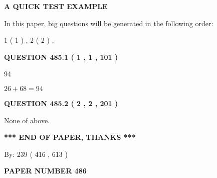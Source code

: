 \documentclass[12pt]{article}
\begin{document}
   
 \vspace{0.2in}
{\LARGE {\textbf{ A QUICK TEST EXAMPLE}}}
   
   
   
\vspace{0.2in}
   
In this paper, big questions will be generated in the following order: 
   
   
   1 ( 1 )
 ,
   2 ( 2 )
 .
  
\vspace{0.2in}
  
{\textbf{\Large{QUESTION
485.1 
 ( 1 , 1 , 101 )
}}}
  
  
 
 
\noindent{}

94
 
 
 
 
\noindent{}

$ %
26 +  %
68=   %
94$
 
 
  
\vspace{0.2in}
  
{\textbf{\Large{QUESTION
485.2 
 ( 2 , 2 , 201 )
}}}
  
  
 
 
\noindent{}
 
 
 None of above.
 
 
 
 
   
   
 \vspace{0.2in}
 
   
   
   
   
\vspace{1.0in} 
{\textbf{\large{ *** END OF PAPER, THANKS *** }}} 
   
   
\hspace{1.0in} By: 
 239 ( 416 ,  613 )
   
   
   
   
\newpage 
\setcounter{page}{ 
   486001 } 
   
   
   
   
 {\textbf{ \Large{ PAPER NUMBER  486  }}}
   
   
\vspace{0.2in}
   
\end{document}
